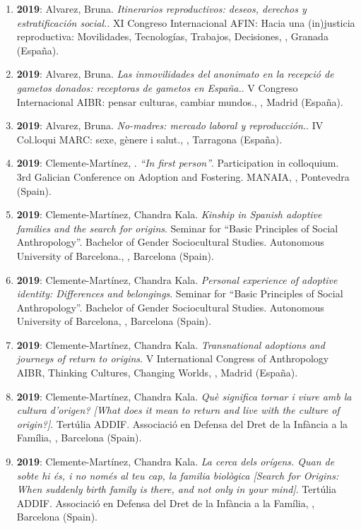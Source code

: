 \begin{enumerate}
\item {\bf 2019}: Alvarez, Bruna. {\it Itinerarios reproductivos: deseos, derechos y estratificación social.}. XI Congreso Internacional AFIN: Hacia una (in)justicia reproductiva: Movilidades, Tecnologías, Trabajos, Decisiones, , Granada (España).\filbreak
\item {\bf 2019}: Alvarez, Bruna. {\it Las inmovilidades del anonimato en la recepció de gametos donados: receptoras de gametos en España.}. V Congreso Internacional AIBR: pensar culturas, cambiar mundos., , Madrid (España).\filbreak
\item {\bf 2019}: Alvarez, Bruna. {\it No-madres: mercado laboral y reproducción.}. IV Col.loqui MARC: sexe, gènere i salut., , Tarragona (España).\filbreak
\item {\bf 2019}: Clemente-Martínez, . {\it “In first person”}. Participation in colloquium. 3rd Galician Conference on Adoption and Fostering. MANAIA, , Pontevedra (Spain).\filbreak
\item {\bf 2019}: Clemente-Martínez, Chandra Kala. {\it Kinship in Spanish adoptive families and the search for origins}. Seminar for “Basic Principles of Social Anthropology”. Bachelor of Gender Sociocultural Studies. Autonomous University of Barcelona., , Barcelona (Spain).\filbreak
\item {\bf 2019}: Clemente-Martínez, Chandra Kala. {\it Personal experience of adoptive identity: Differences and belongings}. Seminar for “Basic Principles of Social Anthropology”. Bachelor of Gender Sociocultural Studies. Autonomous University of Barcelona, , Barcelona (Spain).\filbreak
\item {\bf 2019}: Clemente-Martínez, Chandra Kala. {\it Transnational adoptions and journeys of return to origins}. V International Congress of Anthropology AIBR, Thinking Cultures, Changing Worlds, , Madrid (España).\filbreak
\item {\bf 2019}: Clemente-Martínez, Chandra Kala. {\it Què significa tornar i viure amb la cultura d’origen? [What does it mean to return and live with the culture of origin?]}. Tertúlia ADDIF. Associació en Defensa del Dret de la Infància a la Família, , Barcelona (Spain).\filbreak
\item {\bf 2019}: Clemente-Martínez, Chandra Kala. {\it La cerca dels orígens. Quan de sobte hi és, i no només al teu cap, la familia biològica [Search for Origins: When suddenly birth family is there, and not only in your mind]}. Tertúlia ADDIF. Associació en Defensa del Dret de la Infància a la Família, , Barcelona (Spain).\filbreak

\end{enumerate}

